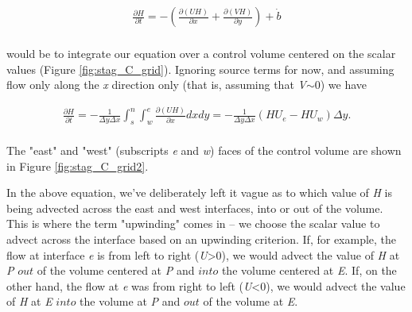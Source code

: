 \begin{align*}
\frac{\partial H}{\partial t}=-\left( \frac{\partial \left( UH \right)}{\partial x}+\frac{\partial \left( VH \right)}{\partial y} \right)+\dot{b} \\ 
\end{align*}

would be to integrate our equation over a control volume centered on the scalar values (Figure \ref{fig:stag_C_grid}). Ignoring source terms for now, and assuming flow only along the \textit{x} direction only (that is, assuming that \textit{V}\(\sim\)0) we have

\begin{align*}
\frac{\partial H}{\partial t}=-\frac{1}{\Delta y\Delta x}\int_{s}^{n}{\int_{w}^{e}{\frac{\partial \left( UH \right)}{\partial x}}}dxdy=-\frac{1}{\Delta y\Delta x}\left( HU_{e}-HU_{w} \right)\Delta y. \\
\end{align*}

The "east" and "west" (subscripts \textit{e} and \textit{w}) faces of the control volume are shown in Figure \ref{fig:stag_C_grid2}.


In the above equation, we've deliberately left it vague as to which value of \textit{H} is being advected across the east and west interfaces, into or out of the volume. This is where the term "upwinding" comes in -- we choose the scalar value to advect across the interface based on an upwinding criterion. If, for example, the flow at interface \textit{e} is from left to right (\textit{U}>0), we would advect the value of \textit{H} at \textit{P} $out$ of the volume centered at \textit{P} and $into$ the volume centered at \textit{E}. If, on the other hand, the flow at \textit{e} was from right to left (\textit{U}<0), we would advect the value of \textit{H} at \textit{E} $into$ the volume at \textit{P} and $out$ of the volume at \textit{E}. 

